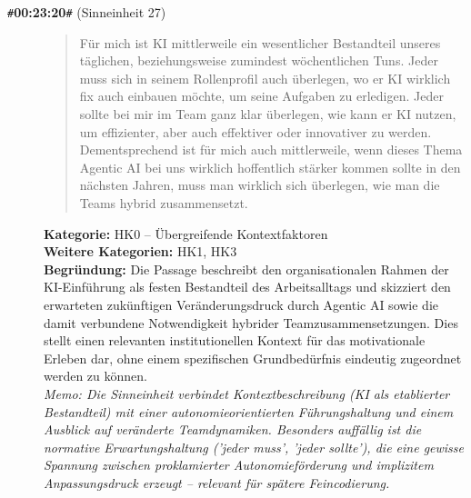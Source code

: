 \begin{description}
  \item[\texttt{\#}\textbf{00:23:20}\texttt{\#} (Sinneinheit 27)]
  \begin{quote}
  Für mich ist KI mittlerweile ein wesentlicher Bestandteil unseres täglichen, beziehungsweise zumindest wöchentlichen Tuns. Jeder muss sich in seinem Rollenprofil auch überlegen, wo er KI wirklich fix auch einbauen möchte, um seine Aufgaben zu erledigen. Jeder sollte bei mir im Team ganz klar überlegen, wie kann er KI nutzen, um effizienter, aber auch effektiver oder innovativer zu werden. Dementsprechend ist für mich auch mittlerweile, wenn dieses Thema Agentic AI bei uns wirklich hoffentlich stärker kommen sollte in den nächsten Jahren, muss man wirklich sich überlegen, wie man die Teams hybrid zusammensetzt.
  \end{quote}
  \textbf{Kategorie:} HK0 -- Übergreifende Kontextfaktoren\\
  \textbf{Weitere Kategorien:} HK1, HK3\\
  \textbf{Begr\"undung:} Die Passage beschreibt den organisationalen Rahmen der KI-Einführung als festen Bestandteil des Arbeitsalltags und skizziert den erwarteten zukünftigen Veränderungsdruck durch Agentic AI sowie die damit verbundene Notwendigkeit hybrider Teamzusammensetzungen. Dies stellt einen relevanten institutionellen Kontext für das motivationale Erleben dar, ohne einem spezifischen Grundbedürfnis eindeutig zugeordnet werden zu können.
  \\\textit{Memo: Die Sinneinheit verbindet Kontextbeschreibung (KI als etablierter Bestandteil) mit einer autonomieorientierten Führungshaltung und einem Ausblick auf veränderte Teamdynamiken. Besonders auffällig ist die normative Erwartungshaltung ('jeder muss', 'jeder sollte'), die eine gewisse Spannung zwischen proklamierter Autonomieförderung und implizitem Anpassungsdruck erzeugt – relevant für spätere Feincodierung.}
\end{description}
\medskip

